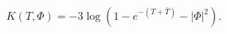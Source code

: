 \begin{equation} \label{kpotmat}
K(T, \Phi) = -3 \log( 1 - e^{-(T + \bar{T})} - |\Phi|^2) .
\end{equation}

